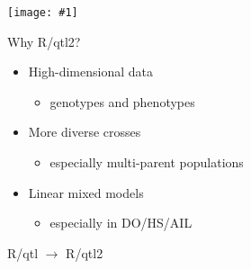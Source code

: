 \documentclass[12pt]{article}
\newcommand{\headsize}{\fontsize{35}{35} \selectfont}
\newcommand{\smallsize}{\fontsize{25}{30} \selectfont}
\newcommand{\smallersize}{\fontsize{20}{25} \selectfont}
\newcommand{\figh}[2]{\centerline{\texttt{[image: \#1]}}}
\begin{document}
\vspace{5mm}

\figh{Figs/hs.pdf}{0.9}





\newpage

\headsize \color{myyellow}
\hfill \begin{minipage}{5.75in}
\centering
Why R/qtl2?
\end{minipage}

\vspace{3cm}

\color{mywhite} \smallsize

\hfill \begin{minipage}[t]{9.5in}
\begin{itemize}
\itemsep24pt
\setlength{\rightskip}{0pt plus 1fil} %
\item High-dimensional data
  \begin{itemize}
  \item[] {\color{myblue} \smallersize genotypes and phenotypes}
  \end{itemize}
\item More diverse crosses
  \begin{itemize}
  \item[] {\color{myblue} \smallersize especially multi-parent populations}
  \end{itemize}
\item Linear mixed models
  \begin{itemize}
  \item[] {\color{myblue} \smallersize especially in DO/HS/AIL}
  \end{itemize}
\end{itemize} \end{minipage}


\newpage

\headsize \color{myyellow}
\hfill\begin{minipage}{5.75in}
\centering
R/qtl $\rightarrow$ R/qtl2
\end{minipage}

\vspace{1cm}

\color{mywhite} \smallsize
\end{document}
